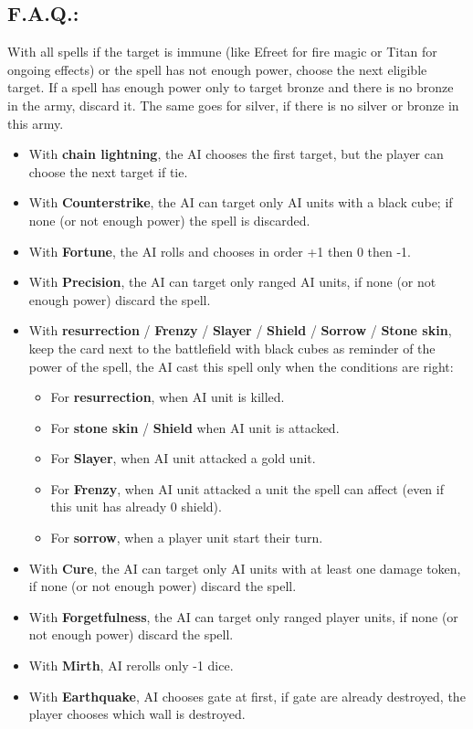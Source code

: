 \newpage

\subsection*{\MakeUppercase{F.A.Q.:}}

\begin{multicols}{2}
With all spells if the target is immune (like Efreet for fire magic or Titan for ongoing effects) or the spell has not enough power, choose the next eligible target. If a spell has enough power only to target bronze and there is no bronze in the army, discard it. The same goes for silver, if there is no silver or bronze in this army.

\begin{itemize}
    \item With \textbf{chain lightning}, the AI chooses the first target, but the player can choose the next target if tie.
    \item With \textbf{Counterstrike}, the AI can target only AI units with a black cube; if none (or not enough power) the spell is discarded.
    \item With \textbf{Fortune}, the AI rolls and chooses in order +1 then 0 then -1.
    \item With \textbf{Precision}, the AI can target only ranged AI units, if none (or not enough power) discard the spell.
    \item With \textbf{resurrection} / \textbf{Frenzy} / \textbf{Slayer} / \textbf{Shield} / \textbf{Sorrow} / \textbf{Stone skin}, keep the card next to the battlefield with black cubes as reminder of the power of the spell, the AI cast this spell only when the conditions are right: 
    \begin{itemize}
        \item For \textbf{resurrection}, when AI unit is killed.
        \item For \textbf{stone skin} / \textbf{Shield} when AI unit is attacked.
        \item For \textbf{Slayer}, when AI unit attacked a gold unit.
        \item For \textbf{Frenzy}, when AI unit attacked a unit the spell can affect (even if this unit has already 0 shield).
        \item For \textbf{sorrow}, when a player unit start their turn.
    \end{itemize}
    \item With \textbf{Cure}, the AI can target only AI units with at least one damage token, if none (or not enough power) discard the spell.
    \item With \textbf{Forgetfulness}, the AI can target only ranged player units, if none (or not enough power) discard the spell. 
    \item With \textbf{Mirth}, AI rerolls only -1 dice.
    \item With \textbf{Earthquake}, AI chooses gate at first, if gate are already destroyed, the player chooses which wall is destroyed.
\end{itemize}


\end{multicols}
